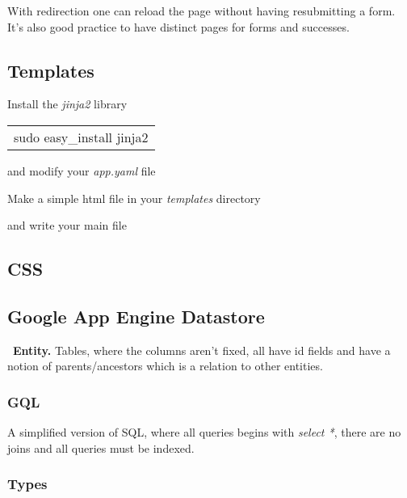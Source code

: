 \documentclass[12pt]{article}
\begin{document}
With redirection one can reload the page without having resubmitting a form. It's also good practice to have distinct pages for forms and successes.



\subsection{Templates}

Install the \emph{jinja2} library

\begin{tabular}{l}
sudo easy\_install jinja2
\end{tabular}

and modify your \emph{app.yaml} file



Make a simple html file in your \emph{templates} directory



and write your main file



\subsection{CSS}



\subsection{Google App Engine Datastore}
\
\textbf{Entity.} Tables, where the columns aren't fixed, all have id fields and have a notion of parents/ancestors which is a relation to other entities.



\subsubsection{GQL}

A simplified version of SQL, where all queries begins with \emph{select *}, there are no joins and all queries must be indexed.



\subsubsection{Types}
\end{document}
